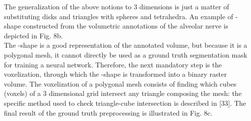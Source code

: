The generalization of the above notions to $3$ dimensions is just a matter of
substituting disks and triangles with spheres and tetrahedra. An example of
\textalpha-shape constructed from the volumetric annotations of the alveolar
nerve is depicted in Fig. 8b.\\
The \textalpha-shape is a good representation of the annotated volume, but
because it is a polygonal mesh, it cannot directly be used as a ground truth
segmentation mask for training a neural network. Therefore, the next mandatory
step is the voxelization, through which the \textalpha-shape is transformed into
a binary raster volume. The voxelization of a polygonal mesh consists of finding
which cubes (voxels) of a 3 dimensional grid intersect any triangle composing
the mesh: the specific method used to check triangle-cube intersection is
described in [33]. The final result of the ground truth preprocessing is
illustrated in Fig. 8c.
